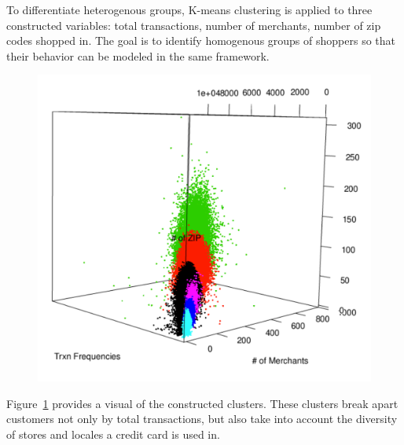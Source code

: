 \documentclass[12pt]{article} %
\begin{document}
To differentiate heterogenous groups, K-means clustering is applied to three constructed variables: total transactions, number of merchants, number of zip codes shopped in.  The goal is to identify homogenous groups of shoppers so that their behavior can be modeled in the same framework.
\begin{figure}[h!]
\centering
\includegraphics[width=6in]{k_means.pdf}
\label{fig:cluster}
\end{figure}
Figure~\ref{fig:cluster} provides a visual of the constructed clusters.  These clusters break apart customers not only by total transactions, but also take into account the diversity of stores and locales a credit card is used in.
\end{document}
